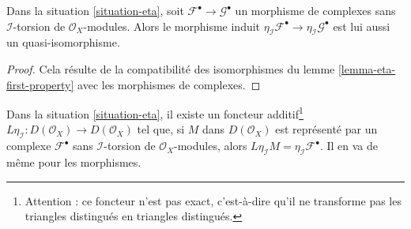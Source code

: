 \begin{lemma}

\label{lemma-eta-qis}
Dans la situation \ref{situation-eta}, soit $\mathcal{F}^\bullet \to \mathcal{G}^\bullet$ un morphisme de complexes sans $\mathcal{I}$-torsion de $\mathcal{O}_X$-modules. Alors le morphisme induit $\eta_\mathcal{I}\mathcal{F}^\bullet \to \eta_\mathcal{I}\mathcal{G}^\bullet$ est lui aussi un quasi-isomorphisme.
\end{lemma}

\begin{proof}

Cela résulte de la compatibilité des isomorphismes du lemme \ref{lemma-eta-first-property}
avec les morphismes de complexes.

\end{proof}

\begin{lemma}

\label{lemma-Leta}
Dans la situation \ref{situation-eta}, il existe un foncteur additif\footnote{Attention : ce foncteur n'est pas exact, c'est-à-dire qu'il ne transforme pas les triangles distingués en triangles distingués.} $L\eta_\mathcal{I} : D(\mathcal{O}_X) \to D(\mathcal{O}_X)$ tel que, si $M$ dans $D(\mathcal{O}_X)$ est représenté par un complexe $\mathcal{F}^\bullet$ sans $\mathcal{I}$-torsion de $\mathcal{O}_X$-modules, alors $L\eta_\mathcal{I}M = \eta_\mathcal{I}\mathcal{F}^\bullet$. Il en va de même pour les morphismes.
\end{lemma}

